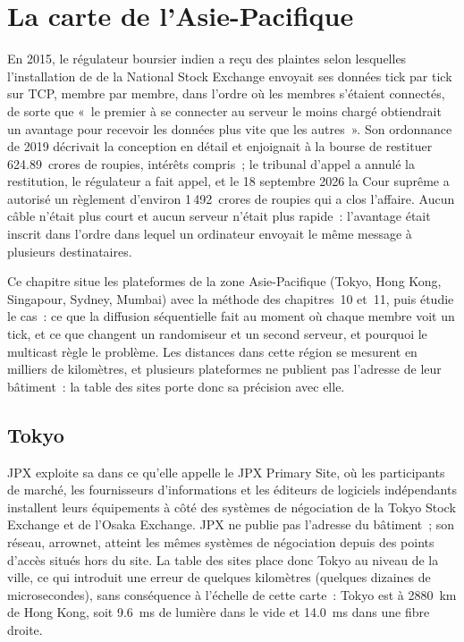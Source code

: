 \chapter{La carte de l'Asie-Pacifique}\label{ch:nw:the-asia-pacific-map}

En 2015, le régulateur boursier indien a reçu des plaintes selon lesquelles l'installation de  de la National Stock Exchange envoyait ses données tick par tick
sur TCP, membre par membre, dans l'ordre où les membres s'étaient connectés, de sorte que «~le premier à se connecter au serveur le moins chargé
obtiendrait un avantage pour recevoir les données plus vite que les autres~». Son ordonnance de 2019 décrivait la conception en détail et
enjoignait à la bourse de restituer 624.89~crores de roupies, intérêts compris~; le tribunal d'appel a annulé la restitution, le régulateur
a fait appel, et le 18 septembre 2026 la Cour suprême a autorisé un règlement d'environ 1\,492~crores de roupies qui a clos l'affaire. Aucun câble
n'était plus court et aucun serveur n'était plus rapide~: l'avantage était inscrit dans l'ordre dans lequel un ordinateur envoyait le même message à plusieurs destinataires.

Ce chapitre situe les plateformes de la zone Asie-Pacifique (Tokyo, Hong Kong, Singapour, Sydney, Mumbai) avec la méthode des chapitres~10 et~11, puis
étudie le cas~: ce que la diffusion séquentielle fait au moment où chaque membre voit un tick, et ce que changent un randomiseur et un second serveur,
et pourquoi le multicast règle le problème. Les distances dans cette région se mesurent en milliers de kilomètres, et plusieurs plateformes ne publient pas
l'adresse de leur bâtiment~: la table des sites porte donc sa précision avec elle.

\section{Tokyo}

JPX exploite sa  dans ce qu'elle appelle le JPX Primary Site, où les participants de marché, les fournisseurs d'informations et les éditeurs de logiciels indépendants
installent leurs équipements à côté des systèmes de négociation de la Tokyo Stock Exchange et de l'Osaka Exchange. JPX ne publie pas
l'adresse du bâtiment~; son réseau, arrownet, atteint les mêmes systèmes de négociation depuis des points d'accès situés hors du site. La table des sites place donc Tokyo au niveau de la ville, ce qui introduit une erreur de quelques kilomètres (quelques dizaines de microsecondes),
sans conséquence à l'échelle de cette carte~: Tokyo est à \qty{2880}{\kilo\metre} de Hong Kong, soit \qty{9.6}{\milli\second} de lumière dans le vide et
\qty{14.0}{\milli\second} dans une fibre droite.

